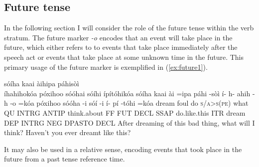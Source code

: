 \documentclass[a4paper, 12pt, oneside]{memoir}
\newcommand{\emh}[1]{\textit{#1}}
\begin{document}
\subsection{Future tense}\label{svfut}
In the following section I will consider the role of the future tense within the verb stratum. The future marker \emh{-o} encodes that an event will take place in the future, which either refers to to events that take place immediately after the speech act or events that take place at some unknown time in the future. This primary usage of the future marker is exemplified in (\ref{ex:future1}).
\begin{examples}
    \ex \label{ex:future1}
    \words sóíha kaai àihipa páhisòì \\ íhahihokóa póxihoo sóóhai sóíhi ípítóhikóa
    \bits sóíha kaai ài =ipa páhi -sòì í- h- ahih -h -o =kóa póxihoo sóóha -i sóí -i í- pí -tóhi =kóa   
    \gloss dream foul do \textsc{\textup{s/a>s(pe)}} what QU INTRG ANTIP think.about FF FUT DECL SSAP do.like.this ITR dream DEP INTRG NEG DPASTO DECL
    \tr After dreaming of this bad thing, what will I think? Haven't you ever dreamt like this?
\end{examples}
It may also be used in a relative sense, encoding events that took place in the future from a past tense reference time. 
\end{document}
